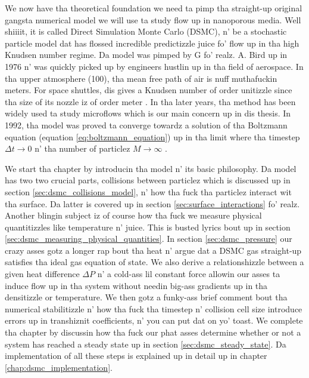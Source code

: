 We now have tha theoretical foundation we need ta pimp tha straight-up original gangsta numerical model we will use ta study flow up in nanoporous media. Well shiiiit, it is called Direct Simulation Monte Carlo (DSMC), n' be a stochastic particle model dat has flossed incredible predictizzle juice fo' flow up in tha high Knudsen number regime. Da model was pimped by G fo' realz. A. Bird up in 1976 n' was quickly picked up by engineers hustlin up in tha field of aerospace. In tha upper atmosphere (\unit{100}{\kilo\meter}), tha mean free path of air is nuff muthafuckin meters. For space shuttles, dis gives a Knudsen number of order unitizzle since tha size of its nozzle iz of order meter \cite{alexander1997direct}. In tha later years, tha method has been widely used ta study microflows which is our main concern up in dis thesis. In 1992, tha model was proved ta converge towardz a solution of tha Boltzmann equation (equation \eqref{eq:boltzmann_equation}) up in tha limit where tha timestep $\Delta t\rightarrow 0$ n' tha number of particlez $M\rightarrow \infty$ \cite{wagner1992convergence}.

We start tha chapter by introducin tha model n' its basic philosophy. Da model has two two crucial parts, collisions between particlez which is discussed up in section \ref{sec:dsmc_collisions_model}, n' how tha fuck tha particlez interact wit tha surface. Da latter is covered up in section \ref{sec:surface_interactions} fo' realz. Another blingin subject iz of course how tha fuck we measure physical quantitizzles like temperature n' juice. This is busted lyrics bout up in section \ref{sec:dsmc_measuring_physical_quantities}. In section \ref{sec:dsmc_pressure} our crazy asses gotz a longer rap bout tha heat n' argue dat a DSMC gas straight-up satisfies tha ideal gas equation of state. We also derive a relationshizzle between a given heat difference $\Delta P$ n' a cold-ass lil constant force allowin our asses ta induce flow up in tha system without needin big-ass gradients up in tha densitizzle or temperature. We then gotz a funky-ass brief comment bout tha numerical stabilitizzle n' how tha fuck tha timestep n' collision cell size introduce errors up in transhiznit coefficients, n' you can put dat on yo' toast. We complete tha chapter by discussin how tha fuck our phat asses determine whether or not a system has reached a steady state up in section \ref{sec:dsmc_steady_state}. Da implementation of all these steps is explained up in detail up in chapter \ref{chap:dsmc_implementation}.